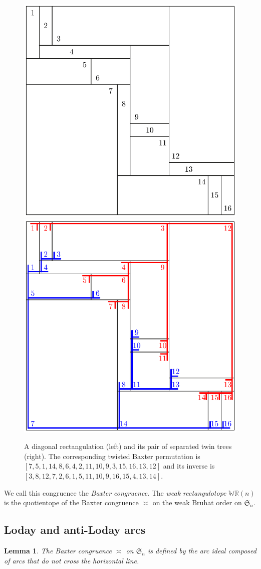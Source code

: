 \documentclass{amsart}
\newtheorem{lemma}[theorem]{Lemma}
\theoremstyle{definition}
\newcommand{\f}[1]{\mathfrak{#1}} %
\newcommand{\darkblue}{\color{darkblue}} %
\newcommand{\defn}[1]{\textsl{\darkblue #1}} %
\newcommand{\polytope}[1]{\mathds{#1}} %
\newcommand{\WRP}{\polytope{WR}} %
\newcommand{\baxtereq}{\asymp}%
\begin{document}
\begin{figure}
	\centerline{\includegraphics[width=.5\textwidth]{weakRectangulation} \qquad \includegraphics[width=.5\textwidth]{weakRectangulationTrees}}
	\caption{A diagonal rectangulation (left) and its pair of separated twin trees (right). The corresponding twisted Baxter permutation is $[7, 5, 1, 14, 8, 6, 4, 2, 11, 10, 9, 3, 15, 16, 13, 12]$ and its inverse is $[3, 8, 12, 7, 2, 6, 1, 5, 11, 10, 9, 16, 15, 4, 13, 14]$.}
\end{figure}

We call this congruence the \defn{Baxter congruence}.
The \defn{weak rectangulotope} $\WRP(n)$ is the quotientope of the Baxter congruence $\baxtereq$ on the weak Bruhat order on $\f{S}_n$.

\subsection{Loday and anti-Loday arcs}

\begin{lemma}
The Baxter congruence $\baxtereq$ on $\f{S}_n$ is defined by the arc ideal composed of arcs that do not cross the horizontal line.
\end{lemma}
\end{document}
